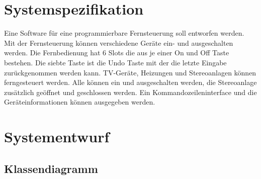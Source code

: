 \documentclass[12pt,a4paper]{article}
\begin{document}
\section{Systemspezifikation}
Eine Software für eine programmierbare Fernsteuerung soll entworfen werden. Mit der Fernsteuerung können verschiedene Geräte ein- und ausgeschalten werden. Die Fernbedienung hat 6 Slots die aus je einer On und Off Taste bestehen. Die siebte Taste ist die Undo Taste mit der die letzte Eingabe zurückgenommen werden kann. TV-Geräte, Heizungen und Stereoanlagen können ferngesteuert werden. Alle können ein und ausgeschalten werden, die Stereoanlage zusätzlich geöffnet und geschlossen werden. Ein Kommandozeileninterface und die Geräteinformationen können ausgegeben werden.
\\


\newpage
\section {Systementwurf}

\subsection {Klassendiagramm}


\newpage
\end{document}
